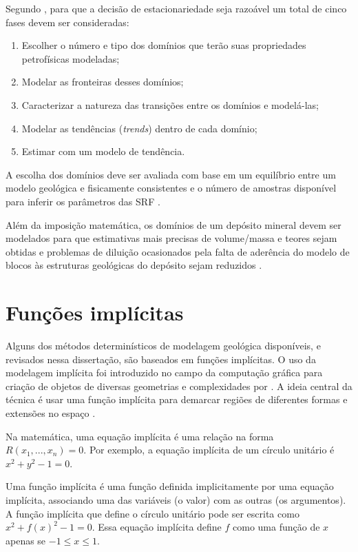 Segundo , para que a decisão de estacionariedade seja razoável um total de cinco fases devem ser consideradas: 
				
\begin{enumerate}
\item{Escolher o número e tipo dos domínios que terão suas propriedades petrofísicas modeladas;}
\item{Modelar as fronteiras desses domínios;}
\item{Caracterizar a natureza das transições entre os domínios e modelá-las;}
\item{Modelar as tendências (\textit{trends}) dentro de cada domínio;}
\item{Estimar com um modelo de tendência.}
\end{enumerate}
				
A escolha dos domínios deve ser avaliada com base em um equilíbrio entre um modelo geológica e fisicamente consistentes e o número de amostras disponível para inferir os parâmetros das SRF \cite{mclennan}.

Além da imposição matemática, os domínios de um depósito mineral devem ser modelados para que estimativas mais precisas de volume/massa e teores sejam obtidas e problemas de diluição ocasionados pela falta de aderência do modelo de blocos às estruturas geológicas do depósito sejam reduzidos \cite{rasera2014estrati}. 
				
\section{Funções implícitas} \label{sec_func_imp}

Alguns dos métodos determinísticos de modelagem geológica disponíveis, e revisados nessa dissertação, são baseados em funções implícitas. O uso da modelagem implícita foi introduzido no campo da computação gráfica para criação de objetos de diversas geometrias e complexidades por . A ideia central da técnica é usar uma função implícita para demarcar regiões de diferentes formas e extensões no espaço \cite{maureira}.

Na matemática, uma equação implícita é uma relação na forma $R(x_1,...,x_n)=0$. Por exemplo, a equação implícita de um círculo unitário é $x^2+y^2-1=0$.

Uma função implícita é uma função definida implicitamente por uma equação implícita, associando uma das variáveis (o valor) com as outras (os argumentos). A função implícita que define o círculo unitário pode ser escrita como $x^2+f(x)^2-1=0$. Essa equação implícita define $f$ como uma função de $x$ apenas se $-1 \leq x\leq 1$.

